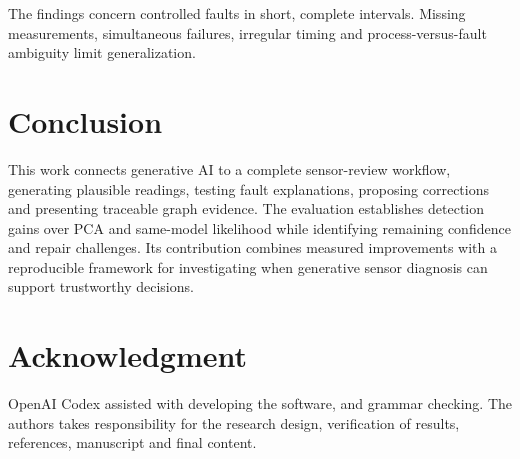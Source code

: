 \documentclass{llncs}
\newcommand{\1}{\mathbf{1}}
\begin{document}
The findings concern controlled faults in short, complete intervals. Missing measurements, simultaneous failures, irregular timing and process-versus-fault ambiguity limit generalization.






\section{Conclusion}
This work connects generative AI to a complete sensor-review workflow, generating plausible readings, testing fault explanations, proposing corrections and presenting traceable graph evidence. The evaluation establishes detection gains over PCA and same-model likelihood while identifying remaining confidence and repair challenges. Its contribution combines measured improvements with a reproducible framework for investigating when generative sensor diagnosis can support trustworthy decisions.

\section*{Acknowledgment}
OpenAI Codex assisted with developing the software, and grammar checking. The authors takes responsibility for the research design, verification of results, references, manuscript and final content.




\end{document}
